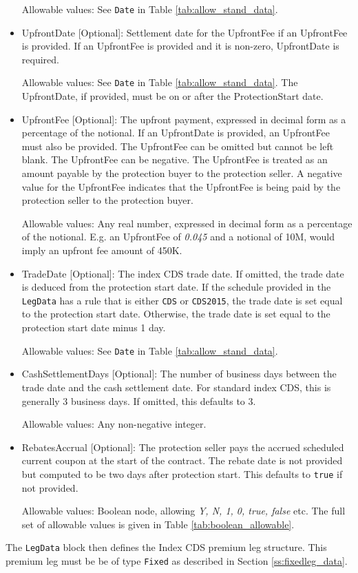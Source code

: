 \begin{itemize}
Allowable values: See \lstinline!Date! in Table \ref{tab:allow_stand_data}.

\item UpfrontDate [Optional]: Settlement date for the UpfrontFee if an UpfrontFee is provided. If an UpfrontFee is provided and it is non-zero, UpfrontDate is required. 

Allowable values: See \lstinline!Date! in Table \ref{tab:allow_stand_data}. The UpfrontDate, if provided, must be on or after the ProtectionStart
date.

\item UpfrontFee [Optional]: The upfront payment, expressed in decimal form as a percentage of the notional. If an UpfrontDate is provided, an UpfrontFee must also be provided. The UpfrontFee can be omitted but cannot be left blank.
The UpfrontFee can be negative. The UpfrontFee is treated as an amount payable by the protection buyer to the protection seller. A negative value for the UpfrontFee indicates that the UpfrontFee is being paid by the protection seller to the protection buyer.

Allowable values: Any real number, expressed in decimal form as a percentage of the notional.  E.g. an UpfrontFee of \emph{0.045} and a notional of 10M, would imply an upfront fee amount of 450K.

\item TradeDate [Optional]: The index CDS trade date. If omitted, the trade date is deduced from the protection start date. If the schedule provided in the \lstinline!LegData! has a rule that is either \lstinline!CDS! or \lstinline!CDS2015!, the trade date is set equal to the protection start date. Otherwise, the trade date is set equal to the protection start date minus 1 day.

Allowable values: See \lstinline!Date! in Table \ref{tab:allow_stand_data}.

\item CashSettlementDays [Optional]: The number of business days between the trade date and the cash settlement date. For standard index CDS, this is generally 3 business days. If omitted, this defaults to 3.

Allowable values: Any non-negative integer.

\item RebatesAccrual [Optional]: The protection seller pays the accrued scheduled current coupon at the start of the contract. The rebate date is not provided but computed to be two days after protection start. This defaults to \lstinline!true! if not provided.

Allowable values: Boolean node, allowing \emph{Y, N, 1, 0, true, false} etc. The full set of allowable values is given in Table \ref{tab:boolean_allowable}.

\end{itemize}

The \lstinline!LegData! block then defines the Index CDS premium leg structure. This premium leg must be be of type \lstinline!Fixed! as described in Section \ref{ss:fixedleg_data}.
